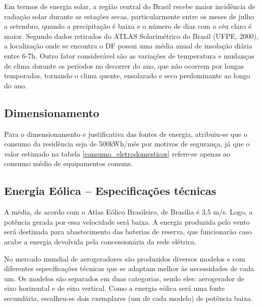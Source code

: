 	Em termos de energia solar, a região central do Brasil recebe maior incidência de radiação solar durante as estações secas, particularmente entre os meses de julho a setembro, quando a precipitação é baixa e o número de dias com o céu claro é maior. Segundo dados retirados do ATLAS Solarimétrico do Brasil (UFPE, 2000), a localização onde se encontra o DF possui uma média anual de insolação diária entre 6-7h. Outro fator considerável são as variações de temperatura e mudanças de clima durante os períodos no decorrer do ano, que não ocorrem por longas temporadas, tornando o clima quente, ensolarado e seco predominante ao longo do ano.

\subsection{Dimensionamento}

	Para o dimensionamento e justificativa das fontes de energia, atribuiu-se que o consumo da residência seja de 500kWh/mês por motivos de segurança, já que o valor estimado na tabela \ref{consumo_eletrodomesticos} refere-se apenas ao consumo médio de equipamentos comuns.

\subsection{Energia Eólica -- Especificações técnicas}

	A média, de acordo com o Atlas Eólico Brasileiro, de Brasília é 3,5 m/s. Logo, a potência gerada por essa velocidade será baixa. A energia produzida pelo vento será destinada para abastecimento das baterias de reserva, que funcionarão caso acabe a energia devolvida pela concessionária da rede elétrica.
	
	No mercado mundial de aerogeradores são produzidos diversos modelos e com diferentes especificações técnicas que se adaptam melhor às necessidades de cada um. Os modelos são separados em duas categorias, sendo eles: aerogerador de eixo horizontal e de eixo vertical. Como a energia eólica será uma fonte secundária, escolheu-se dois exemplares (um de cada modelo) de potência baixa.

